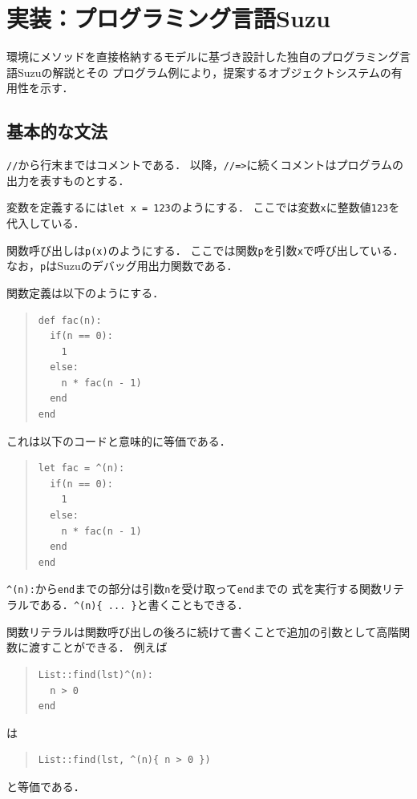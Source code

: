 \documentclass{ipsjprosym}
\begin{document}
\section{実装：プログラミング言語Suzu}
\label{sec:implementation}

環境にメソッドを直接格納するモデルに基づき設計した独自のプログラミング言語Suzuの解説とその
プログラム例により，提案するオブジェクトシステムの有用性を示す．

\subsection{基本的な文法}

\verb|//|から行末まではコメントである．
以降，\verb|//=>|に続くコメントはプログラムの出力を表すものとする．

変数を定義するには\verb|let x = 123|のようにする．
ここでは変数\verb|x|に整数値\verb|123|を代入している．

関数呼び出しは\verb|p(x)|のようにする．
ここでは関数\verb|p|を引数\verb|x|で呼び出している．
なお，\verb|p|はSuzuのデバッグ用出力関数である．

関数定義は以下のようにする．
\begin{quote}
\begin{verbatim}
def fac(n):
  if(n == 0):
    1
  else:
    n * fac(n - 1)
  end
end
\end{verbatim}
\end{quote}
これは以下のコードと意味的に等価である．
\begin{quote}
\begin{verbatim}
let fac = ^(n):
  if(n == 0):
    1
  else:
    n * fac(n - 1)
  end
end
\end{verbatim}
\end{quote}
\verb|^(n):|から\verb|end|までの部分は引数\verb|n|を受け取って\verb|end|までの
式を実行する関数リテラルである．\verb|^(n){ ... }|と書くこともできる．

関数リテラルは関数呼び出しの後ろに続けて書くことで追加の引数として高階関数に渡すことができる．
例えば
\begin{quote}
\begin{verbatim}
List::find(lst)^(n):
  n > 0
end
\end{verbatim}
\end{quote}
は
\begin{quote}
\begin{verbatim}
List::find(lst, ^(n){ n > 0 })
\end{verbatim}
\end{quote}
と等価である．
\end{document}
